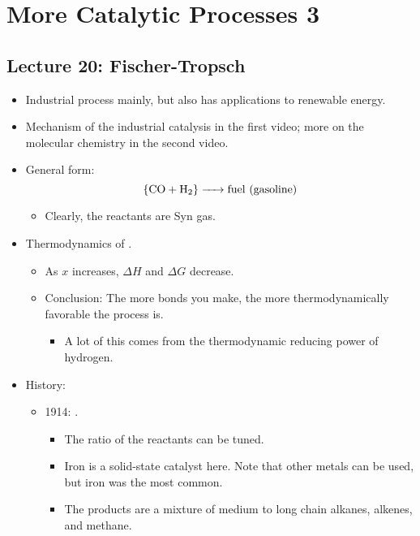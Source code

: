 \documentclass[../notes.tex]{subfiles}
\begin{document}
\chapter{More Catalytic Processes 3}
\section{Lecture 20: Fischer-Tropsch}
\begin{itemize}
    \item {}Industrial process mainly, but also has applications to renewable energy.
    \item Mechanism of the industrial catalysis in the first video; more on the molecular chemistry in the second video.
    \item General form:
    \begin{equation*}
        \ce{\{CO + H2\} -> {fuel (gasoline)}}
    \end{equation*}
    \begin{itemize}
        \item Clearly, the reactants are Syn gas.
    \end{itemize}
    \item Thermodynamics of .
    \begin{itemize}
        \item As $x$ increases, $\Delta H$ and $\Delta G$ decrease.
        \item Conclusion: The more  bonds you make, the more thermodynamically favorable the process is.
        \begin{itemize}
            \item A lot of this comes from the thermodynamic reducing power of hydrogen.
        \end{itemize}
    \end{itemize}
    \item History:
    \begin{itemize}
        \item 1914: .
        \begin{itemize}
            \item The ratio of the reactants can be tuned.
            \item Iron is a solid-state catalyst here. Note that other metals can be used, but iron was the most common.
            \item The products are a mixture of medium to long chain alkanes, alkenes, and methane.

\end{itemize}
\end{itemize}
\end{itemize}
\end{document}
